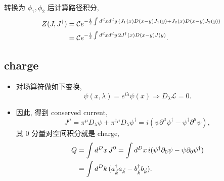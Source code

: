 \begin{itemize}
	\begin{tcolorbox}[title=calculation:]
		转换为 $\phi_1, \phi_2$ 后计算路径积分,
		\begin{align}
			Z(J, J^\dag) &= \mathcal{C} e^{- \frac{i}{2} \int d^d x d^d y \, (J_1(x) D(x - y) J_1(y) + J_2(x) D(x - y) J_2(y))} \notag \\
			&= \mathcal{C} e^{- \frac{i}{2} \int d^d x d^d y \, 2 J^\dag(x) D(x - y) J(y)}.
		\end{align}
	\end{tcolorbox}
\end{itemize}

\subsection{charge}
\begin{itemize}
	\item 对场算符做如下变换,
	\begin{equation}
		\psi(x, \lambda) = e^{i \lambda} \psi(x) \Longrightarrow D_\lambda \mathcal{L} = 0.
	\end{equation}
	
	\item 因此, 得到 conserved current,
	\begin{equation}
		J^\mu = \pi^\mu D_\lambda \psi + \pi^{\dag \mu} D_\lambda \psi^{\dag} = i (\psi \partial^\mu \psi^\dag - \psi^\dag \partial^\mu \psi),
	\end{equation}
	其 $0$ 分量对空间积分就是 charge,
	\begin{align}
		Q &= \int d^D x \, J^0 = \int d^D x \, i (\psi^\dag \partial_0 \psi - \psi \partial_0 \psi^\dag) \notag \\
		&= \int d^D k \, (a^\dag_{\vec{k}} a_{\vec{k}} - b^\dag_{\vec{k}} b_{\vec{k}}).
	\end{align}
	

\end{itemize}
